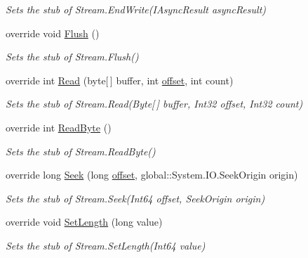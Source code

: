 \begin{DoxyCompactItemize}
\begin{DoxyCompactList}\small\item\em Sets the stub of Stream.\-End\-Write(\-I\-Async\-Result async\-Result)\end{DoxyCompactList}\item 
override void \hyperlink{class_system_1_1_net_1_1_security_1_1_fakes_1_1_stub_authenticated_stream_a9af40b8a2917665d47a7cde0e1db5130}{Flush} ()
\begin{DoxyCompactList}\small\item\em Sets the stub of Stream.\-Flush()\end{DoxyCompactList}\item 
override int \hyperlink{class_system_1_1_net_1_1_security_1_1_fakes_1_1_stub_authenticated_stream_ac597532355e5b9d5b22efc121f1eb841}{Read} (byte\mbox{[}$\,$\mbox{]} buffer, int \hyperlink{jquery-1_810_82_8js_a4a9f594d20d927164551fc7fa4751a2f}{offset}, int count)
\begin{DoxyCompactList}\small\item\em Sets the stub of Stream.\-Read(\-Byte\mbox{[}$\,$\mbox{]} buffer, Int32 offset, Int32 count)\end{DoxyCompactList}\item 
override int \hyperlink{class_system_1_1_net_1_1_security_1_1_fakes_1_1_stub_authenticated_stream_a1aecafb7b8968698a702a0c63843650c}{Read\-Byte} ()
\begin{DoxyCompactList}\small\item\em Sets the stub of Stream.\-Read\-Byte()\end{DoxyCompactList}\item 
override long \hyperlink{class_system_1_1_net_1_1_security_1_1_fakes_1_1_stub_authenticated_stream_a60b9e5ca55b59c815d506b6bd30ccd3b}{Seek} (long \hyperlink{jquery-1_810_82_8js_a4a9f594d20d927164551fc7fa4751a2f}{offset}, global\-::\-System.\-I\-O.\-Seek\-Origin origin)
\begin{DoxyCompactList}\small\item\em Sets the stub of Stream.\-Seek(\-Int64 offset, Seek\-Origin origin)\end{DoxyCompactList}\item 
override void \hyperlink{class_system_1_1_net_1_1_security_1_1_fakes_1_1_stub_authenticated_stream_aaf8d5183e9b3279e4daa770918ba257e}{Set\-Length} (long value)
\begin{DoxyCompactList}\small\item\em Sets the stub of Stream.\-Set\-Length(\-Int64 value)\end{DoxyCompactList}\item 

\end{DoxyCompactItemize}
